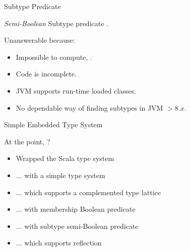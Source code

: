 \begin{frame}{Subtype Predicate}

  \emph{Semi-Boolean} Subtype predicate .

  \usebox\subtypebox

  Unanswerable because:
  \begin{itemize}
  \item Impossible to compute, \eg {}.
  \item Code is incomplete.
  \item JVM supports run-time loaded classes.
  \item No dependable way of finding subtypes in JVM $> 8.x$.
  \end{itemize}

\end{frame}

\begin{frame}{Simple Embedded Type System}

  At the point, ?

  \begin{itemize}
  \item Wrapped the Scala type system
  \item ... with a simple type system
  \item ... which supports a complemented type lattice
  \item ... with membership Boolean predicate
  \item ... with subtype semi-Boolean predicate
  \item ... which supports reflection
  \end{itemize}

\end{frame}

